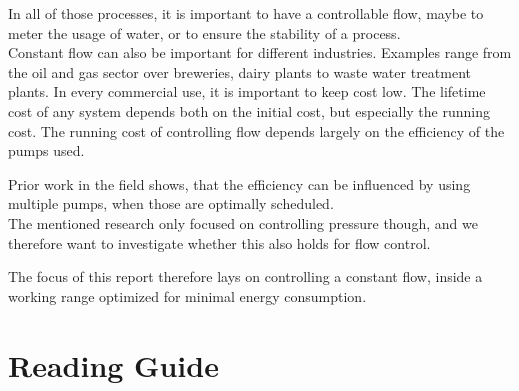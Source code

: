 In all of those processes,
it is important to have a controllable flow,
maybe to meter the usage of water,
or to ensure the stability of a process.\\
Constant flow can also be important for different industries.
Examples range from the oil and gas sector\cite{OilFlow} over breweries\cite{BrewFlow},
dairy plants\cite{DairyFlow} to waste water treatment plants\cite{WastewaterFlow}.
In every commercial use,
it is important to keep cost low.
The lifetime cost of any system depends both on the initial cost,
but especially the running cost. \cite{LifetimeCost}
The running cost of controlling flow depends largely on the efficiency of the pumps used.\cite{LifeCycleCostEfficiency}

Prior work in the field shows, that the efficiency can be influenced by using multiple pumps,
when those are optimally scheduled. \cite{YangMultiPump2008}\\
The mentioned research only focused on controlling pressure though,
and we therefore want to investigate whether this also holds for flow control.

The focus of this report therefore lays on controlling a constant flow,
inside a working range optimized for minimal energy consumption.
%
%
%
%
%
%
%
%
%
%
%
%

\cleardoublepage
\section*{Reading Guide}


